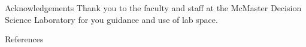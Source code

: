 \documentclass[22pt]{beamer}
\begin{document}
\begin{frame}[fragile]
\begin{textblock}{7.25}
\begin{block}{Acknowledgements}
Thank you to the faculty and staff at the McMaster Decision Science Laboratory for you guidance and use of lab space.
\end{block}

\begin{block}{References}

{\scriptsize
}
\end{block}

\begin{comment}
\begin{block}{References}
\setbeamertemplate{bibliography item}{\insertbiblabel}

{\scriptsize
}
\end{block}
\vspace{-1.8mm}
\end{comment}
\end{textblock}


\end{frame}
\end{document}
